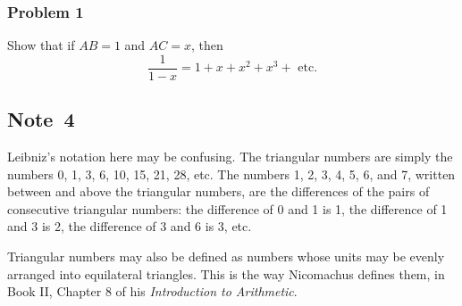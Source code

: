 \documentclass[polutonikogreek,english,twoside,openright]{article}
\begin{document}
\subsubsection*{Problem 1}\label{geosum}

Show that if $AB =1$ and $AC = x$, then 
$$\frac{1}{1-x} = 1 + x + x^2 + x^3 + \mbox{ etc.}$$

\subsection*{Note~4}
\label{caa4}

Leibniz's notation here may be confusing.  The triangular numbers are simply the numbers 0, 1, 3, 6, 10, 15, 21, 28, etc.  The numbers 1, 2, 3, 4, 5, 6, and 7, written between and above the triangular numbers, are the differences of the pairs of consecutive triangular numbers: the difference of 0 and 1 is 1, the difference of 1 and 3 is 2, the difference of 3 and 6 is 3, etc.

Triangular numbers may also be defined as numbers whose units may be evenly arranged into equilateral triangles.  This is the way Nicomachus defines them, in Book II, Chapter 8 of his {\em Introduction to Arithmetic}. 
\end{document}
